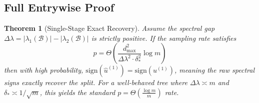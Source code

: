 \documentclass[11pt]{article}
\newtheorem{theorem}{Theorem}
\begin{document}
\subsection{Full Entrywise Proof}

\begin{theorem}[Single-Stage Exact Recovery]
Assume the spectral gap $\Delta\lambda = |\lambda_1(\mathcal{B})| - |\lambda_2(\mathcal{B})|$ is strictly positive. If the sampling rate satisfies
\begin{equation}
p = \Theta\left(\frac{d_{\max}^2}{\Delta\lambda^2 \cdot \delta_*^2} \log m\right)
\end{equation}
then with high probability, $\text{sign}(\hat{u}^{(1)}) = \text{sign}(u^{(1)})$, meaning the raw spectral signs exactly recover the split. For a well-behaved tree where $\Delta\lambda \asymp m$ and $\delta_* \asymp 1/\sqrt{m}$, this yields the standard $p = \Theta(\frac{\log m}{m})$ rate.
\end{theorem}
\end{document}
